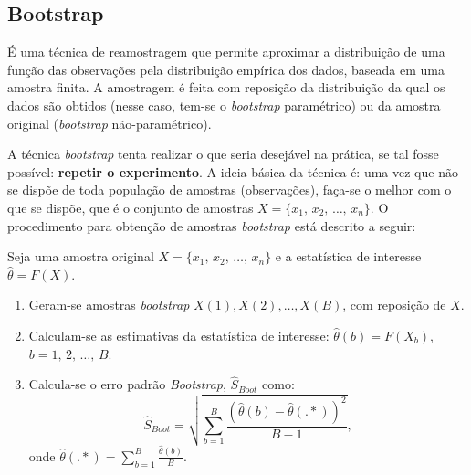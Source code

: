 \documentclass[
]{estat/estat}
\providecommand{\tightlist}{%
  \setlength{\itemsep}{0pt}\setlength{\parskip}{0pt}}\usepackage{longtable,booktabs,array}
\begin{document}
\subsection{Bootstrap}\label{bootstrap}

É uma técnica de reamostragem que permite aproximar a distribuição de
uma função das observações pela distribuição empírica dos dados, baseada
em uma amostra finita. A amostragem é feita com reposição da
distribuição da qual os dados são obtidos (nesse caso, tem-se o
\emph{bootstrap} paramétrico) ou da amostra original (\emph{bootstrap}
não-paramétrico).

A técnica \emph{bootstrap} tenta realizar o que seria desejável na
prática, se tal fosse possível: \textbf{repetir o experimento}. A ideia
básica da técnica é: uma vez que não se dispõe de toda população de
amostras (observações), faça-se o melhor com o que se dispõe, que é o
conjunto de amostras \(X = \{x_1, \, x_2, \, \ldots, \, x_n\}\). O
procedimento para obtenção de amostras \emph{bootstrap} está descrito a
seguir:

Seja uma amostra original \(X = \{x_1, \, x_2, \, \ldots, \, x_n\}\) e a
estatística de interesse \(\hat{\theta} = F(X)\).

\begin{enumerate}
\def\labelenumi{\arabic{enumi}.}
\tightlist
\item
  Geram-se amostras \emph{bootstrap} \(X(1), X(2), \ldots, X(B)\), com
  reposição de \(X\).
\item
  Calculam-se as estimativas da estatística de interesse:
  \(\hat{\theta}(b) = F(X_b)\), \(b = 1, \, 2, \, \ldots, \, B\).
\item
  Calcula-se o erro padrão \emph{Bootstrap}, \(\hat{S}_{Boot}\) como:
  \[\hat{S}_{Boot} = \sqrt{\sum_{b=1}^{B}\frac{(\hat{\theta}(b)-\hat{\theta}(.*))^2}{B-1}},\]
  onde \(\hat{\theta}(.*) = \sum_{b=1}^{B}\frac{\hat{\theta}(b)}{B}\).
\end{enumerate}
\end{document}
